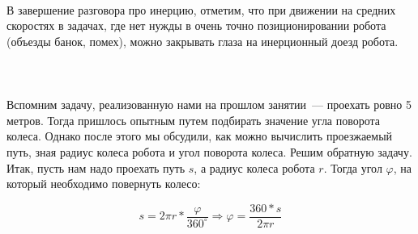 {\programm
	{\slshape{}}\rC{()}\\
	\rC{\{}\\
	\indent{}\\
	\indent{}\\
	\indent{}\\
	\\
	\indent\rC{\{}\\
	\indent\indent{}\\
	\indent\rC{\}}\\
	\indent{}\indent{}\\
	\rC{\}}\\
}\\\\	

В завершение разговора про инерцию, отметим, что при движении на средних скоростях в задачах, где нет нужды в очень точно позиционировании робота (объезды банок, помех), можно закрывать глаза на инерционный доезд робота.\\\\

{\hypertarget{lesson11x3}{}}\\\\

Вспомним задачу, реализованную нами на прошлом занятии~--- проехать ровно 5 метров. Тогда пришлось опытным путем подбирать значение угла поворота колеса. Однако после этого мы обсудили, как можно вычислить проезжаемый путь, зная радиус колеса робота и угол поворота колеса. Решим обратную задачу.
Итак, пусть нам надо проехать путь \(s\), а радиус колеса робота \(r\). Тогда угол \(\varphi\), на который необходимо повернуть колесо:

\begin{equation}
s=2\pi r*\frac{\varphi}{360^{\circ}}\Rightarrow\varphi=\frac{360*s}{2\pi r}
\end{equation}


